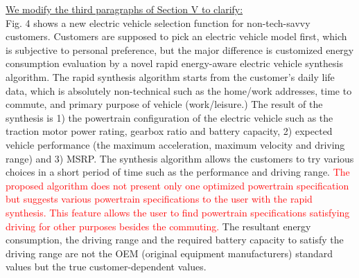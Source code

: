 \documentclass[onecolumn]{IEEEconf}
\begin{document}
\begin{description}
\underline{We modify the third paragraphs of Section V to clarify:}\\
Fig. 4 shows a new electric vehicle selection function for non-tech-savvy customers. Customers are supposed to pick an electric vehicle model first, which is subjective to personal preference, but the major difference is customized energy consumption evaluation by a novel rapid energy-aware electric vehicle synthesis algorithm. The rapid synthesis algorithm starts from the customer’s daily life data, which is absolutely non-technical such as the home/work addresses, time to commute, and primary purpose of vehicle (work/leisure.) The result of the synthesis is 1) the powertrain configuration of the electric vehicle such as the traction motor power rating, gearbox ratio and battery capacity, 2) expected vehicle performance (the maximum acceleration, maximum velocity and driving range) and 3) MSRP. The synthesis algorithm allows the customers to try various choices in a short period of time such as the performance and driving range. 
\textcolor{red}{The proposed algorithm does not present only one optimized powertrain specification but suggests various powertrain specifications to the user with the rapid synthesis. This feature allows the user to find powertrain specifications satisfying driving for other purposes besides the commuting.}
The resultant energy consumption, the driving range and the required battery capacity to satisfy the driving range are not the OEM (original equipment manufacturers) standard values but the true customer-dependent values. 

\end{description}

\pagebreak
\end{document}
